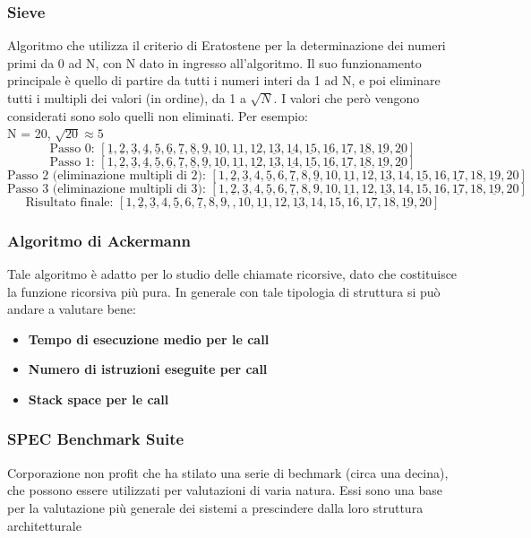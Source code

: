 \subsubsection{Sieve}
Algoritmo che utilizza il criterio di Eratostene per la determinazione dei numeri primi da 0 ad N, con N dato in ingresso all'algoritmo. Il suo funzionamento principale è quello di partire da tutti i numeri interi da 1 ad N, e poi eliminare tutti i multipli dei valori (in ordine), da 1 a \(\sqrt{N}\). I valori che però vengono considerati sono solo quelli non eliminati.
Per esempio:
\\
N = 20, \(\sqrt{20} \approx 5\)
\[
\text{Passo 0: }[\underline{1},\underline{2},\underline{3},\underline{4},\underline{5},\underline{6},\underline{7},\underline{8},\underline{9},\underline{10},\underline{11},\underline{12},\underline{13},\underline{14},\underline{15},\underline{16},\underline{17},\underline{18},\underline{19},\underline{20}]
\]
\[
\text{Passo 1: }[1,\underline{2},\underline{3},\underline{4},\underline{5},\underline{6},\underline{7},\underline{8},\underline{9},\underline{10},\underline{11},\underline{12},\underline{13},\underline{14},\underline{15},\underline{16},\underline{17},\underline{18},\underline{19},\underline{20}]
\]
\[
\text{Passo 2 (eliminazione multipli di 2): }[1,\underline{2},\underline{3},4,\underline{5},6,\underline{7},8,\underline{9},10,\underline{11},12,\underline{13},14,\underline{15},16,\underline{17},18,\underline{19},20]
\]
\[
\text{Passo 3 (eliminazione multipli di 3): }[1,\underline{2},\underline{3},4,\underline{5},6,\underline{7},8,9,10,\underline{11},12,\underline{13},14,15,16,\underline{17},18,\underline{19},20]
\]
\[
\text{Risultato finale: }[1,\underline{2},\underline{3},4,\underline{5},6,\underline{7},8,9,,10,\underline{11},12,\underline{13},14,15,16,\underline{17},18,\underline{19},20]
\]

\subsubsection{Algoritmo di Ackermann}
Tale algoritmo è adatto per lo studio delle chiamate ricorsive, dato che costituisce la funzione ricorsiva più pura. In generale con tale tipologia di struttura si può andare a valutare bene:
\begin{itemize}
    \item \textbf{Tempo di esecuzione medio per le call}
    \item \textbf{Numero di istruzioni eseguite per call}
    \item \textbf{Stack space per le call}
\end{itemize}

\subsubsection{SPEC Benchmark Suite}
Corporazione non profit che ha stilato una serie di bechmark (circa una decina), che possono essere utilizzati per valutazioni di varia natura. Essi sono una base per la valutazione più generale dei sistemi a prescindere dalla loro struttura architetturale

